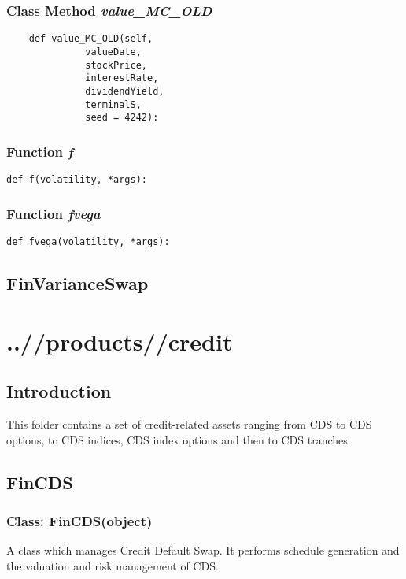 \documentclass[twoside,11pt]{book}
\begin{document}
\subsection{Class Method {\it value\_MC\_OLD}}


\begin{lstlisting}
    def value_MC_OLD(self,
              valueDate,
              stockPrice,
              interestRate,
              dividendYield,
              terminalS,
              seed = 4242):
\end{lstlisting}

\subsection{Function {\it f}}


\begin{lstlisting}
def f(volatility, *args):
\end{lstlisting}

\subsection{Function {\it fvega}}


\begin{lstlisting}
def fvega(volatility, *args):
\end{lstlisting}

\newpage
\section{FinVarianceSwap}


\chapter{..//products//credit}
\section{Introduction}
This folder contains a set of credit-related assets ranging from CDS to CDS options, to CDS indices, CDS index options and then to CDS tranches. 
\newpage
\section{FinCDS}

\subsection{Class: FinCDS(object)}
A class which manages Credit Default Swap. It performs schedule generation and the valuation and risk management of CDS. 
\end{document}
